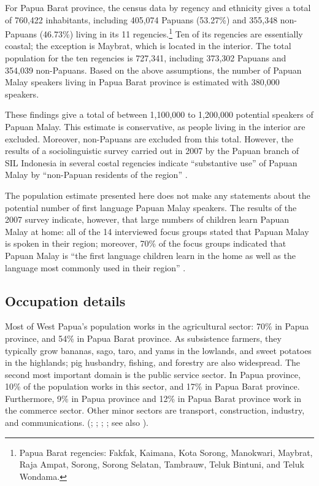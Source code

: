 {For Papua Barat province, the census data by regency and ethnicity gives a total of 760,422 inhabitants, including 405,074 Papuans (53.27\%) and 355,348 non-Papuans (46.73\%) living in its 11 regencies.\footnote{Papua Barat regencies: Fakfak, Kaimana, Kota Sorong, Manokwari, Maybrat, Raja Ampat, Sorong, Sorong Selatan, Tambrauw, Teluk Bintuni, and Teluk Wondama.} Ten of its regencies are essentially coastal; the exception is Maybrat, which is located in the interior. The total population for the ten regencies is 727,341, including 373,302 Papuans and 354,039 non-Papuans. Based on the above assumptions, the number of Papuan Malay speakers living in Papua Barat province is estimated with 380,000 speakers. \citep[11--14]{BidangNeracaWilayahdanAnalisisStatistik.2011b}



These findings give a total of between 1,100,000 to 1,200,000 potential speakers of Papuan Malay. This estimate is conservative, as people living in the interior are excluded. Moreover, non-Papuans are excluded from this total. However, the results of a sociolinguistic survey carried out in 2007 by the Papuan branch of SIL Indonesia in several costal regencies indicate  ``substantive use'' of Papuan Malay by  ``non-Papuan residents of the region'' \citep[11]{Scott.2008}.



The population estimate presented here does not make any statements about the potential number of first language Papuan Malay speakers. The results of the 2007 survey indicate, however, that large numbers of children learn Papuan Malay at home: all of the 14 interviewed focus groups stated that Papuan Malay is spoken in their region; moreover, 70\% of the focus groups indicated that Papuan Malay is  ``the first language children learn in the home as well as the language most commonly used in their region'' \citep[11]{Scott.2008}.

\subsection{Occupation details}\label{Para_1.7.2}
\largerpage
Most of West Papua’s population works in the agricultural sector: 70\% in Papua province, and 54\% in Papua Barat province. As subsistence farmers, they typically grow bananas, sago, taro, and yams in the lowlands, and sweet potatoes in the highlands; pig husbandry, fishing, and forestry are also widespread. The second most important domain is the public service sector. In Papua province, 10\% of the population works in this sector, and 17\% in Papua Barat province. Furthermore, 9\% in Papua province and 12\% in Papua Barat province work in the commerce sector. Other minor sectors are transport, construction, industry, and communications. (\citealt[21]{BidangNeracaWilayahdanAnalisisStatistik.2011b}; \citeyear*[12]{BidangNeracaWilayahdanAnalisisStatistik.2012}; \citealt{EncyclopaediaBritannica.2001b}; \citeyear*{EncyclopaediaBritannica.2001};  see also \citealt[83]{BidangNeracaWilayahdanAnalisisStatistik.2012b}).



}

